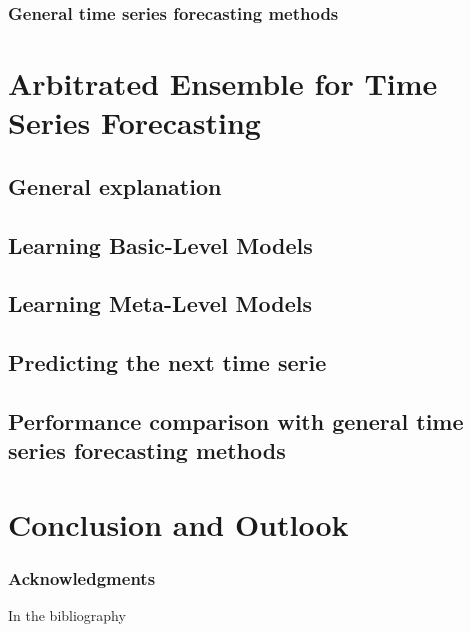 \documentclass[runningheads,a4paper]{llncs}[2015/06/24]
\begin{document}
		\subsubsection{General time series forecasting methods}
\section{Arbitrated Ensemble for Time Series Forecasting}
\subsection{General explanation}
\subsection{Learning Basic-Level Models}
\subsection{Learning Meta-Level Models}
\subsection{Predicting the next time serie}
\subsection{Performance comparison with general time series forecasting methods}

\section{Conclusion and Outlook}

\subsubsection*{Acknowledgments}

\cite{VtorCerqueira2017} In the bibliography




\end{document}
